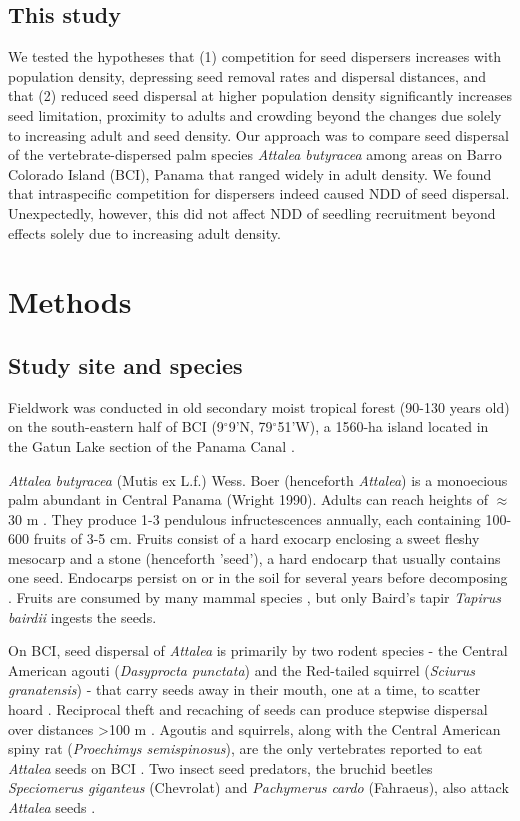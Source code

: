 \documentclass[b5paper,justified]{tufte-book} %
\begin{document}
\begin{fullwidth}
\subsection{This study}
We tested the hypotheses that (1) competition for seed dispersers increases with population density, depressing seed
removal rates and dispersal distances, and that (2) reduced seed dispersal at higher population density significantly
increases seed limitation, proximity to adults and crowding beyond the changes due solely to increasing adult and seed density. Our approach was to compare seed dispersal of the vertebrate-dispersed palm species \textit{Attalea butyracea} among areas on Barro Colorado Island (BCI), Panama that ranged widely in adult density. We found that intraspecific competition for dispersers indeed caused NDD of seed dispersal. Unexpectedly, however, this did not affect NDD of seedling recruitment beyond effects solely due to increasing adult density.


\section{Methods}

\subsection{Study site and species}
Fieldwork was conducted in old secondary moist tropical forest (90-130 years old) on the south-eastern half of BCI
(9$^{\circ}$9'N, 79$^{\circ}$51'W), a 1560-ha island located in the Gatun Lake section of the Panama Canal \citep{Leigh1999}. 

\textit{Attalea butyracea} (Mutis ex L.f.) Wess. Boer (henceforth \textit{Attalea}) is a monoecious palm abundant in Central Panama (Wright 1990). Adults can reach heights of $\approx$30 m \citep{DeSteven1987}. They produce 1-3 pendulous infructescences annually, each containing 100-600 fruits of 3-5 cm. Fruits consist of a hard exocarp enclosing a sweet fleshy mesocarp and a stone (henceforth 'seed'), a hard endocarp that usually contains one seed. Endocarps persist on or in the soil for several years before decomposing \citep{Wright1983, Wright1990}. Fruits are consumed by many mammal species \citep[][and references therein]{Wright2001a}, but only Baird's tapir \textit{Tapirus bairdii} ingests the seeds.

On BCI, seed dispersal of \textit{Attalea} is primarily by two rodent species - the Central American agouti (\textit{Dasyprocta punctata}) and the Red-tailed squirrel (\textit{Sciurus granatensis}) - that carry seeds away in their mouth, one at a time, to scatter hoard \citep{Forget1994, Wright2001a}. Reciprocal theft and recaching of seeds can produce stepwise dispersal over distances >100 m \citep{Hirsch2012a, Jansen2012}. Agoutis and squirrels, along with the Central American spiny rat (\textit{Proechimys semispinosus}), are the only vertebrates reported to eat \textit{Attalea} seeds on BCI \citep{Forget1994a}. Two insect seed predators, the bruchid beetles \textit{Speciomerus giganteus} (Chevrolat) and \textit{Pachymerus cardo} (Fahraeus), also attack \textit{Attalea} seeds \citep{Wright1983}. 


\end{fullwidth}
\end{document}
